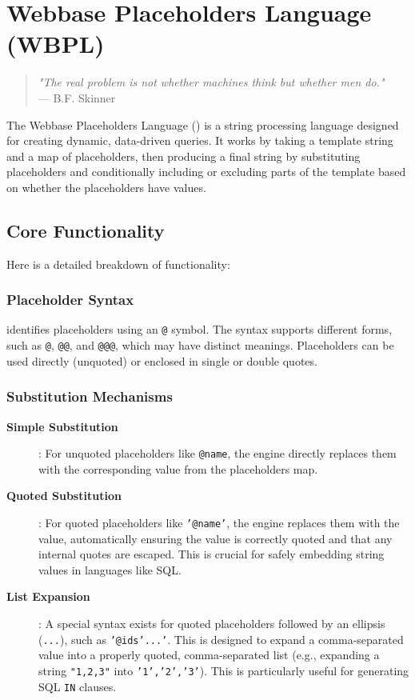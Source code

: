 
\chapter{Webbase Placeholders Language (WBPL)}
\label{chap:wbpl}

\begin{quote}
\textit{"The real problem is not whether machines think but whether men do."} \\
— B.F. Skinner
\end{quote}

The Webbase Placeholders Language (\wbpl{}) is a string processing language designed for creating dynamic, data-driven queries. It works by taking a template string and a map of placeholders, then producing a final string by substituting placeholders and conditionally including or excluding parts of the template based on whether the placeholders have values.

\section{Core Functionality}
\label{sec:wbpl-core}

Here is a detailed breakdown of \wbpl{} functionality:

\subsection{Placeholder Syntax}

\wbpl{} identifies placeholders using an \texttt{@} symbol. The syntax supports different forms, such as \texttt{@}, \texttt{@@}, and \texttt{@@@}, which may have distinct meanings. Placeholders can be used directly (unquoted) or enclosed in single or double quotes.

\subsection{Substitution Mechanisms}

\begin{description}
\item[\textbf{Simple Substitution}]: For unquoted placeholders like \texttt{@name}, the engine directly replaces them with the corresponding value from the placeholders map.

\item[\textbf{Quoted Substitution}]: For quoted placeholders like \texttt{'@name'}, the engine replaces them with the value, automatically ensuring the value is correctly quoted and that any internal quotes are escaped. This is crucial for safely embedding string values in languages like SQL.

\item[\textbf{List Expansion}]: A special syntax exists for quoted placeholders followed by an ellipsis (\texttt{...}), such as \texttt{'@ids'...'}. This is designed to expand a comma-separated value into a properly quoted, comma-separated list (e.g., expanding a string \texttt{"1,2,3"} into \texttt{'1','2','3'}). This is particularly useful for generating SQL \texttt{IN} clauses.
\end{description}

